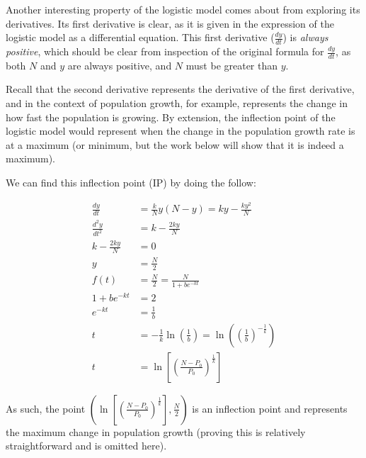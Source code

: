 \documentclass[12pt]{article}
\begin{document}
\begin{itemize}
    Another interesting property of the logistic model comes about from exploring its derivatives. Its first derivative is clear, as it is given in the expression of the logistic model as a differential equation. This first derivative ($\frac{dy}{dt}$) is \textit{always positive}, which should be clear from inspection of the original formula for $\frac{dy}{dt}$, as both $N$ and $y$ are always positive, and $N$ must be greater than $y$.

    Recall that the second derivative represents the derivative of the first derivative, and in the context of population growth, for example, represents the change in how fast the population is growing. By extension, the inflection point of the logistic model would represent when the change in the population growth rate is at a maximum (or minimum, but the work below will show that it is indeed a maximum).

    We can find this inflection point (IP) by doing the follow:

    \begin{equation}
        \begin{split}
            \frac{dy}{dt} &= \frac{k}{N}y(N-y) = ky - \frac{ky^2}{N}\\
            \frac{d^2y}{dt^2} &= k - \frac{2ky}{N}\\
            k - \frac{2ky}{N} &= 0\\
            y &= \frac{N}{2}\\
            f(t) &= \frac{N}{2} = \frac{N}{1+be^{-kt}}\\
            1+be^{-kt} &= 2\\
            e^{-kt} &= \frac{1}{b}\\
            t &= -\frac{1}{k}\ln(\frac{1}{b}) = \ln((\frac{1}{b})^{-\frac{1}{k}})\\
            t &= \ln[(\frac{N-P_0}{P_0})^{\frac{1}{k}}]
        \end{split}
    \end{equation}

    As such, the point $(\ln[(\frac{N-P_0}{P_0})^{\frac{1}{k}}],\frac{N}{2})$ is an inflection point and represents the maximum change in population growth (proving this is relatively straightforward and is omitted here).


\end{itemize}
\end{document}
